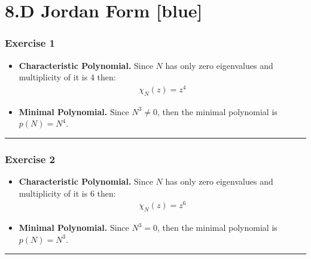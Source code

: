 \documentclass[12pt, letterpaper]{scrartcl}
\begin{document}
\section*{8.D Jordan Form \xrfill[2pt]{3pt}[blue]}

\subsubsection*{Exercise 1}
\begin{itemize}
    \item \textbf{Characteristic Polynomial.} Since $N$ has only zero eigenvalues and multiplicity of it is 4 then:
    \begin{align*}
        \chi_N(z)=z^4
    \end{align*}
    \item \textbf{Minimal Polynomial.} Since $N^3\neq0$, then the minimal polynomial is $p(N)=N^4$.
\end{itemize}
\vskip1mm\hrule

\subsubsection*{Exercise 2}
\begin{itemize}
    \item \textbf{Characteristic Polynomial.} Since $N$ has only zero eigenvalues and multiplicity of it is 6 then:
    \begin{align*}
        \chi_N(z)=z^6
    \end{align*}
    \item \textbf{Minimal Polynomial.} Since $N^3=0$, then the minimal polynomial is $p(N)=N^3$.
\end{itemize}
\vskip1mm\hrule

\end{document}
